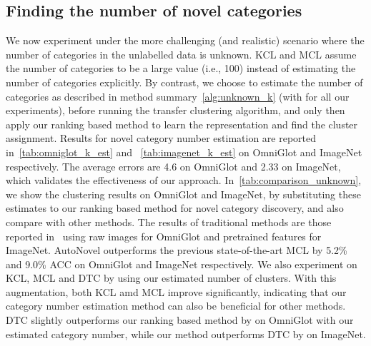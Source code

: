 \subsection{Finding the number of novel categories}
\label{s:results_unknown_k}
We now experiment under the more challenging (and realistic) scenario where the number of categories in the unlabelled data is unknown.
KCL and MCL assume the number of categories to be a large value (i.e., 100) instead of estimating the number of categories explicitly.
By contrast, we choose to estimate the number of categories as described in method summary~\ref{alg:unknown_k} (with  for all our experiments), before running the transfer clustering algorithm, and only then apply our ranking based method to learn the representation and find the cluster assignment.
Results for novel category number estimation are reported in~\cref{tab:omniglot_k_est} and ~\cref{tab:imagenet_k_est} on OmniGlot and ImageNet respectively. The average errors are 4.6 on OmniGlot and 2.33 on ImageNet, which validates the effectiveness of our approach.
In~\cref{tab:comparison_unknown}, we show the clustering results on OmniGlot and ImageNet, by substituting these estimates to our ranking based method for novel category discovery, and also compare with other methods.
The results of traditional methods are those reported in~\cite{Hsu19_MCL} using raw images for OmniGlot and pretrained features for ImageNet.
AutoNovel outperforms the previous state-of-the-art MCL by 5.2\% and  9.0\% ACC on OmniGlot and ImageNet respectively.
We also experiment on KCL, MCL and DTC by using our estimated number of clusters.
With this augmentation, both KCL amd MCL improve significantly, indicating that our category number estimation method can also be beneficial for other methods. DTC slightly outperforms our ranking based method by  on OmniGlot with our estimated category number, while our method outperforms DTC by  on ImageNet.


